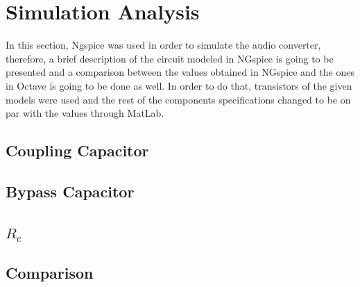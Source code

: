 \section{Simulation Analysis}
\label{sec:simulation}

In this section, Ngspice was used in order to simulate the audio converter, therefore, a brief description of the circuit modeled in NGspice is going to be presented and a comparison between the values obtained in NGspice and the ones in Octave is going to be done as well. In order to do that, transistors of the given models were used and the rest of the components specifications changed to be on par with the values through MatLab.


\subsection{Coupling Capacitor}




\subsection{Bypass Capacitor}





\subsection{$R_c$}





\subsection{Comparison}





%

%

